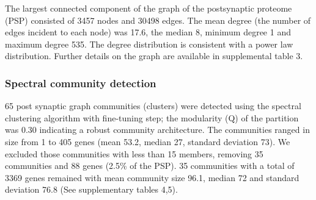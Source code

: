 The largest connected component of the graph of the postsynaptic proteome (PSP) consisted of 3457 nodes and 30498 edges. The mean degree (the number of edges incident to each node) was 17.6, the median 8, minimum degree 1 and maximum degree 535. The degree distribution is consistent with a power law distribution. Further details on the graph are available in supplemental table 3. 
\subsubsection{Spectral community detection}
65 post synaptic graph communities (clusters) were detected using the spectral clustering algorithm with fine-tuning step; the modularity (Q) of the partition was 0.30 indicating a robust community architecture.  The communities ranged in size from 1 to 405 genes (mean 53.2, median 27, standard deviation 73). We excluded those communities with less than 15 members, removing 35 communities and 88 genes (2.5\% of the PSP). 35 communities with a total of 3369 genes remained with mean community size 96.1, median 72 and standard deviation 76.8 (See supplementary tables 4,5).   

